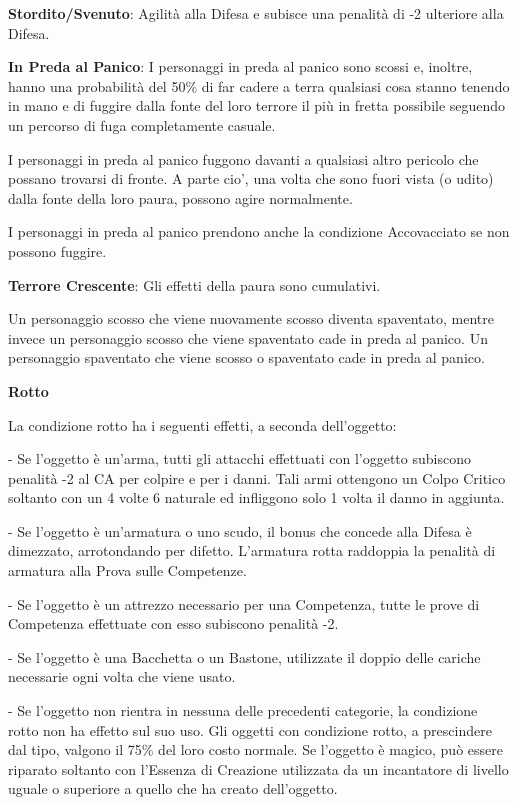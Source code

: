 \documentclass[a4paper,11pt,twoside,openany]{book}
\begin{document}
{\textbf{Stordito/Svenuto}: Agilità alla Difesa e subisce una penalità di -2 ulteriore alla Difesa.

\textbf{In Preda al Panico}: I personaggi in preda al panico sono scossi e, inoltre, hanno una probabilità del 50\% di far cadere a terra qualsiasi cosa stanno tenendo in mano e di fuggire dalla fonte del loro terrore il più in fretta possibile seguendo un percorso di fuga completamente casuale.

I personaggi in preda al panico fuggono davanti a qualsiasi altro pericolo che possano trovarsi di fronte. A parte cio', una volta che sono fuori vista (o udito) dalla fonte della loro paura, possono agire normalmente.

I personaggi in preda al panico prendono anche la condizione Accovacciato se non possono fuggire.

\textbf{Terrore Crescente}: Gli effetti della paura sono cumulativi.

Un personaggio scosso che viene nuovamente scosso diventa spaventato, mentre invece un personaggio scosso che viene spaventato cade in preda al panico. Un personaggio spaventato che viene scosso o spaventato cade in preda al panico.

\textbf{Rotto}

La condizione rotto ha i seguenti effetti, a seconda dell'oggetto:

- Se l'oggetto è un'arma, tutti gli attacchi effettuati con l'oggetto subiscono penalità -2 al CA per colpire e per i danni. Tali armi ottengono un Colpo Critico soltanto con un 4 volte 6 naturale ed infliggono solo 1 volta il danno in aggiunta.

- Se l'oggetto è un'armatura o uno scudo, il bonus che concede alla Difesa è dimezzato, arrotondando per difetto. L'armatura rotta raddoppia la penalità di armatura alla Prova sulle Competenze.

- Se l'oggetto è un attrezzo necessario per una Competenza, tutte le prove di Competenza effettuate con esso subiscono penalità -2.

- Se l'oggetto è una Bacchetta o un Bastone, utilizzate il doppio delle cariche necessarie ogni volta che viene usato.

- Se l'oggetto non rientra in nessuna delle precedenti categorie, la condizione rotto non ha effetto sul suo uso. Gli oggetti con condizione rotto, a prescindere dal tipo, valgono il 75\% del loro costo normale. Se l'oggetto è magico, può essere riparato soltanto con l'Essenza di Creazione utilizzata da un incantatore di livello uguale o superiore a quello che ha creato dell'oggetto.

}
\end{document}
